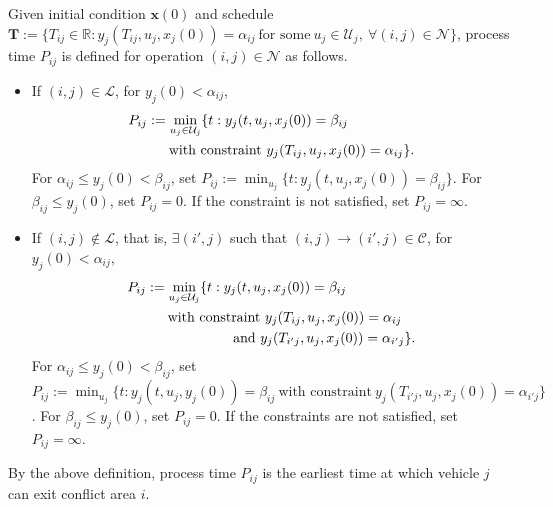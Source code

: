 \documentclass{sig-alternate}
\begin{document}
\begin{definition}\label{definition:job-shop}
	Given initial condition $\mathbf{x}(0)$ and schedule $\mathbf{T}:=\{T_{ij}\in\mathbb{R}: y_j(T_{ij},u_j,x_j(0))=\alpha_{ij}~\text{for some}~u_j\in\mathcal{U}_j,~\forall (i,j)\in\mathcal{N}\}$, process time $P_{ij}$ is defined for operation $(i,j)\in \mathcal{N}$ as follows.
	
	\begin{itemize}
		\item If $(i,j)\in\mathcal{L}$, for $y_j(0)<\alpha_{ij}$, 
		\begin{align}\label{definition:P_in_L}
		\begin{split}
		&P_{ij}:=\min_{u_j\in\mathcal{U}_j}\{t:y_j(t,u_j,x_j(0))=\beta_{ij}\\
		&\hspace{0.4 in}\text{with constraint}~y_j(T_{ij},u_j,x_j(0))=\alpha_{ij}\}.
		\end{split}
		\end{align}
		For $\alpha_{ij}\leq y_j(0)<\beta_{ij}$, set $P_{ij}:=\min_{u_j}\{t:y_j(t,u_j,x_j(0))=\beta_{ij}\}$. For $\beta_{ij}\leq y_j(0)$, set $P_{ij}=0$. If the constraint is not satisfied, set $P_{ij}=\infty$.
		\item If $(i,j)\notin \mathcal{L}$, that is, $\exists (i',j)$ such that $(i,j)\rightarrow(i',j)\in\mathcal{C}$, for $y_j(0)<\alpha_{ij}$,
		\begin{align}\label{definition:P_notin_L}
		\begin{split}
		&P_{ij}:=\min_{u_j\in\mathcal{U}_j}\{t:y_j(t,u_j,x_j(0))=\beta_{ij}\\
		&\hspace{0.4 in}\text{with constraint}~y_j(T_{ij},u_j,x_j(0))=\alpha_{ij}\\
		&\hspace{1.05 in}\text{and}~y_j(T_{i'j},u_j,x_j(0))=\alpha_{i'j}\}.
		\end{split}
		\end{align}
		For $\alpha_{ij}\leq y_j(0)<\beta_{ij}$, set $P_{ij}:=\min_{u_j}\{t:y_j(t,u_j,y_j(0))=\beta_{ij}~\text{with constraint}~y_j(T_{i'j},u_j,x_j(0))=\alpha_{i'j}\}$. For $\beta_{ij}\leq y_j(0)$, set $P_{ij}=0$. If the constraints are not satisfied, set $P_{ij}=\infty$.
	\end{itemize}
\end{definition}
By the above definition, process time $P_{ij}$ is the earliest time at which vehicle $j$ can exit conflict area $i$.
\end{document}
